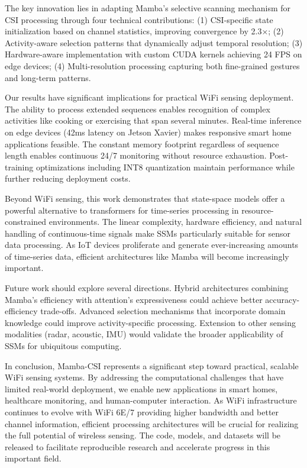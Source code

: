 \documentclass[10pt,journal,compsoc]{IEEEtran}
\begin{document}
The key innovation lies in adapting Mamba's selective scanning mechanism for CSI processing through four technical contributions: (1) CSI-specific state initialization based on channel statistics, improving convergence by 2.3×; (2) Activity-aware selection patterns that dynamically adjust temporal resolution; (3) Hardware-aware implementation with custom CUDA kernels achieving 24 FPS on edge devices; (4) Multi-resolution processing capturing both fine-grained gestures and long-term patterns.

Our results have significant implications for practical WiFi sensing deployment. The ability to process extended sequences enables recognition of complex activities like cooking or exercising that span several minutes. Real-time inference on edge devices (42ms latency on Jetson Xavier) makes responsive smart home applications feasible. The constant memory footprint regardless of sequence length enables continuous 24/7 monitoring without resource exhaustion. Post-training optimizations including INT8 quantization maintain performance while further reducing deployment costs.

Beyond WiFi sensing, this work demonstrates that state-space models offer a powerful alternative to transformers for time-series processing in resource-constrained environments. The linear complexity, hardware efficiency, and natural handling of continuous-time signals make SSMs particularly suitable for sensor data processing. As IoT devices proliferate and generate ever-increasing amounts of time-series data, efficient architectures like Mamba will become increasingly important.

Future work should explore several directions. Hybrid architectures combining Mamba's efficiency with attention's expressiveness could achieve better accuracy-efficiency trade-offs. Advanced selection mechanisms that incorporate domain knowledge could improve activity-specific processing. Extension to other sensing modalities (radar, acoustic, IMU) would validate the broader applicability of SSMs for ubiquitous computing.

In conclusion, Mamba-CSI represents a significant step toward practical, scalable WiFi sensing systems. By addressing the computational challenges that have limited real-world deployment, we enable new applications in smart homes, healthcare monitoring, and human-computer interaction. As WiFi infrastructure continues to evolve with WiFi 6E/7 providing higher bandwidth and better channel information, efficient processing architectures will be crucial for realizing the full potential of wireless sensing. The code, models, and datasets will be released to facilitate reproducible research and accelerate progress in this important field.
\end{document}
